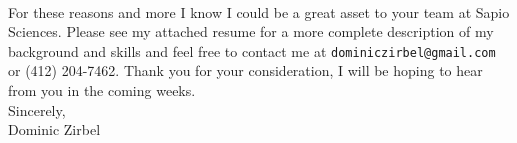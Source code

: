 \documentclass[letterpaper,10pt]{article}
\newcommand{\lb}{\vspace{14pt} \\}
\begin{document}
\lb
For these reasons and more I know I could be a great asset to your team at Sapio Sciences. Please see my attached resume for a more complete description of my background and skills and feel free to contact me at \texttt{dominiczirbel@gmail.com} or (412) 204-7462. Thank you for your consideration, I will be hoping to hear from you in the coming weeks.
\lb
Sincerely, \\
Dominic Zirbel
\end{document}
